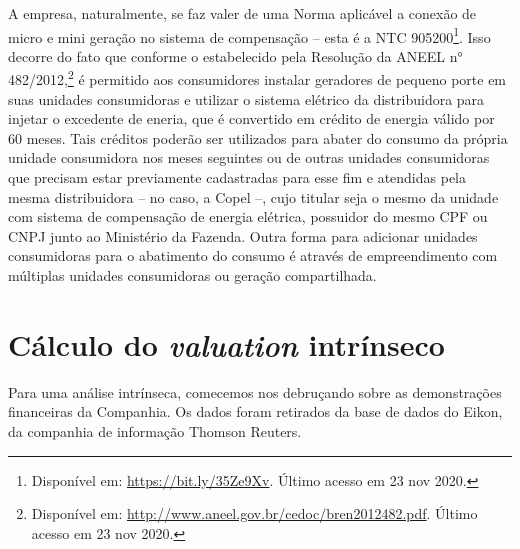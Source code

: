 \documentclass[grad,numbers]{coppe}
\begin{document}
  A empresa, naturalmente, se faz valer de uma Norma aplicável a conexão de micro e mini geração no sistema de compensação -- esta é a NTC 905200\footnote{Disponível em: \url{https://bit.ly/35Ze9Xv}. Último acesso em 23 nov 2020.}. Isso decorre do fato que conforme o estabelecido pela Resolução da ANEEL n° 482/2012,\footnote{Disponível em: \url{http://www.aneel.gov.br/cedoc/bren2012482.pdf}. Último acesso em 23 nov 2020.} é permitido aos consumidores instalar geradores de pequeno porte em suas unidades consumidoras e utilizar o sistema elétrico da distribuidora para injetar o excedente de eneria, que é convertido em crédito de energia válido por 60 meses. Tais créditos poderão ser utilizados para abater do consumo da própria unidade consumidora nos meses seguintes ou de outras unidades consumidoras que precisam estar previamente cadastradas para esse fim e atendidas pela mesma distribuidora -- no caso, a Copel --, cujo titular seja o mesmo da unidade com sistema de compensação de energia elétrica, possuidor do mesmo CPF ou CNPJ junto ao Ministério da Fazenda. Outra forma para adicionar unidades consumidoras para o abatimento do consumo é através de empreendimento com múltiplas unidades consumidoras ou geração compartilhada.

  \hypertarget{cuxe1lculo-do-valuation-intruxednseco}{%
  \section{\texorpdfstring{Cálculo do \emph{valuation} intrínseco}{Cálculo do valuation intrínseco}}\label{cuxe1lculo-do-valuation-intruxednseco}}

  Para uma análise intrínseca, comecemos nos debruçando sobre as demonstrações financeiras da Companhia. Os dados foram retirados da base de dados do Eikon, da companhia de informação Thomson Reuters.
\end{document}
